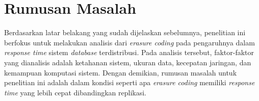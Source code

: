\section{Rumusan Masalah}

Berdasarkan latar belakang yang sudah dijelaskan sebelumnya, penelitian ini berfokus untuk melakukan analisis dari \textit{erasure coding} pada pengaruhnya dalam \textit{response time} sistem \textit{database} terdistribusi. Pada analisis tersebut, faktor-faktor yang dianalisis adalah ketahanan sistem, ukuran data, kecepatan jaringan, dan kemampuan komputasi sistem. Dengan demikian, rumusan masalah untuk penelitian ini adalah dalam kondisi seperti apa \textit{erasure coding} memiliki \textit{response time} yang lebih cepat dibandingkan replikasi.
